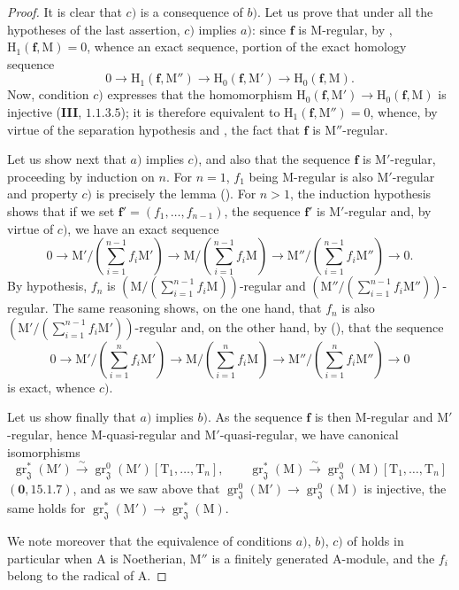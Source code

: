 \begin{proof}
It is clear that $c)$ is a consequence of $b)$. Let us prove that under all the hypotheses of the last assertion, $c)$ implies $a)$: since $\mathbf{f}$ is M-regular, by , $\mathrm{H}_1(\mathbf{f},\mathrm{M})=0$, whence an exact sequence, portion of the exact homology sequence
\[
  0\to\mathrm{H}_1(\mathbf{f},\mathrm{M}'')\to\mathrm{H}_0(\mathbf{f},\mathrm{M}')\to\mathrm{H}_0(\mathbf{f},\mathrm{M}).
\]
Now, condition $c)$ expresses that the homomorphism $\mathrm{H}_0(\mathbf{f},\mathrm{M}')\to\mathrm{H}_0(\mathbf{f},\mathrm{M})$ is injective (\textbf{III}, $1.1.3.5$); it is therefore equivalent to $\mathrm{H}_1(\mathbf{f},\mathrm{M}'')=0$, whence, by virtue of the separation hypothesis and , the fact that $\mathbf{f}$ is $\mathrm{M}''$-regular.

Let us show next that $a)$ implies $c)$, and also that the sequence $\mathbf{f}$ is $\mathrm{M}'$-regular, proceeding by induction on $n$. For $n=1$, $f_1$ being M-regular is also $\mathrm{M}'$-regular and property $c)$ is precisely the lemma (). For $n>1$, the induction hypothesis shows that
if we set $\mathbf{f}'=(f_1,\ldots,f_{n-1})$, the sequence $\mathbf{f}'$ is $\mathrm{M}'$-regular and, by virtue of $c)$, we have an exact sequence
\[
  0\to\mathrm{M}'/(\textstyle\sum_{i=1}^{n-1}f_i\mathrm{M}')\to\mathrm{M}/(\textstyle\sum_{i=1}^{n-1}f_i\mathrm{M})\to\mathrm{M}''/(\textstyle\sum_{i=1}^{n-1}f_i\mathrm{M}'')\to 0.
\]
By hypothesis, $f_n$ is $(\mathrm{M}/(\sum_{i=1}^{n-1}f_i\mathrm{M}))$-regular and $(\mathrm{M}''/(\sum_{i=1}^{n-1}f_i\mathrm{M}''))$-regular. The same reasoning shows, on the one hand, that $f_n$ is also $(\mathrm{M}'/(\sum_{i=1}^{n-1}f_i\mathrm{M}'))$-regular and, on the other hand, by (), that the sequence
\[
  0\to\mathrm{M}'/(\textstyle\sum_{i=1}^{n}f_i\mathrm{M}')\to\mathrm{M}/(\textstyle\sum_{i=1}^{n}f_i\mathrm{M})\to\mathrm{M}''/(\textstyle\sum_{i=1}^{n}f_i\mathrm{M}'')\to 0
\]
is exact, whence $c)$.

Let us show finally that $a)$ implies $b)$. As the sequence $\mathbf{f}$ is then M-regular and $\mathrm{M}'$-regular, hence M-quasi-regular and $\mathrm{M}'$-quasi-regular, we have canonical isomorphisms
\[
  \operatorname{gr}_\mathfrak{J}^*(\mathrm{M}')\xrightarrow{\sim}\operatorname{gr}_\mathfrak{J}^0(\mathrm{M}')[\mathrm{T}_1,\ldots,\mathrm{T}_n],\qquad
  \operatorname{gr}_\mathfrak{J}^*(\mathrm{M})\xrightarrow{\sim}\operatorname{gr}_\mathfrak{J}^0(\mathrm{M})[\mathrm{T}_1,\ldots,\mathrm{T}_n]
\]
$(\mathbf{0},15.1.7)$, and as we saw above that $\operatorname{gr}_\mathfrak{J}^0(\mathrm{M}')\to\operatorname{gr}_\mathfrak{J}^0(\mathrm{M})$ is injective, the same holds for $\operatorname{gr}_\mathfrak{J}^*(\mathrm{M}')\to\operatorname{gr}_\mathfrak{J}^*(\mathrm{M})$.

We note moreover that the equivalence of conditions $a)$, $b)$, $c)$ of  holds in particular when $\mathrm{A}$ is Noetherian, $\mathrm{M}''$ is a finitely generated $\mathrm{A}$-module, and the $f_i$ belong to the radical of $\mathrm{A}$.
\end{proof}

